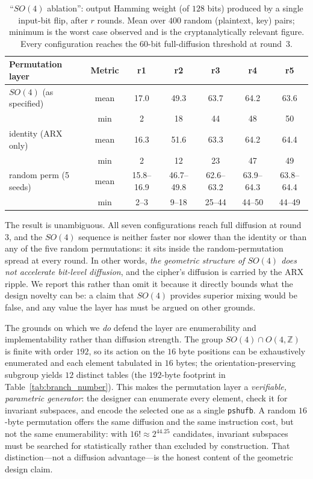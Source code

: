 \documentclass[review,12pt]{elsarticle}
\begin{document}
\begin{table}[htbp]
\caption{``$SO(4)$ ablation'': output Hamming weight (of $128$ bits) produced by a single input-bit flip, after $r$ rounds. Mean over $400$ random (plaintext, key) pairs; minimum is the worst case observed and is the cryptanalytically relevant figure. Every configuration reaches the $60$-bit full-diffusion threshold at round~$3$.}
\label{tab:layer_ablation}
\centering
\small
\begin{tabular}{lcccccc}
\toprule
\textbf{Permutation layer} & \textbf{Metric} & \textbf{r1} & \textbf{r2} & \textbf{r3} & \textbf{r4} & \textbf{r5} \\
\midrule
$SO(4)$ (as specified) & mean & 17.0 & 49.3 & 63.7 & 64.2 & 63.6 \\
                       & min  & 2    & 18   & 44   & 48   & 50 \\
identity (ARX only)    & mean & 16.3 & 51.6 & 63.3 & 64.2 & 64.4 \\
                       & min  & 2    & 12   & 23   & 47   & 49 \\
random perm (5 seeds)  & mean & 15.8--16.9 & 46.7--49.8 & 62.6--63.2 & 63.9--64.3 & 63.8--64.4 \\
                       & min  & 2--3 & 9--18 & 25--44 & 44--50 & 44--49 \\
\bottomrule
\end{tabular}
\end{table}

The result is unambiguous. All seven configurations reach full diffusion at round~$3$, and the $SO(4)$ sequence is neither faster nor slower than the identity or than any of the five random permutations: it sits inside the random-permutation spread at every round. In other words, \emph{the geometric structure of $SO(4)$ does not accelerate bit-level diffusion}, and the cipher's diffusion is carried by the ARX ripple. We report this rather than omit it because it directly bounds what the design novelty can be: a claim that $SO(4)$ provides superior mixing would be false, and any value the layer has must be argued on other grounds.

The grounds on which we \emph{do} defend the layer are enumerability and implementability rather than diffusion strength. The group $SO(4) \cap O(4,\mathbb{Z})$ is finite with order $192$, so its action on the $16$ byte positions can be exhaustively enumerated and each element tabulated in $16$ bytes; the orientation-preserving subgroup yields $12$ distinct tables (the $192$-byte footprint in Table~\ref{tab:branch_number}). This makes the permutation layer a \emph{verifiable, parametric generator}: the designer can enumerate every element, check it for invariant subspaces, and encode the selected one as a single \texttt{pshufb}. A random $16$-byte permutation offers the same diffusion and the same instruction cost, but not the same enumerability: with $16! \approx 2^{44.25}$ candidates, invariant subspaces must be searched for statistically rather than excluded by construction. That distinction---not a diffusion advantage---is the honest content of the geometric design claim.
\end{document}
